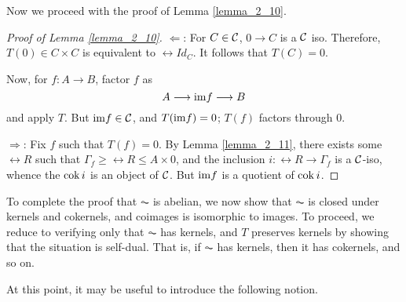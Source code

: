 Now we proceed with the proof of Lemma \ref{lemma_2_10}.

\begin{proof}[Proof of Lemma \ref{lemma_2_10}]
\noindent $\Leftarrow$: For $C \in \mathcal{C}$, $0 \to C$ is
a $\mathcal{C}$ iso. Therefore, $T(0) \in C \times C$ is
equivalent to $\rel{Id}_C$. It follows that $T(C) = 0$.

Now, for $f: A \to B$, factor $f$ as
\[
A \longrightarrow \mathrm{im} f \longrightarrow B
\]
and apply $T$. But $\mathrm{im} f \in \mathcal{C}$, and $T(\mathrm{im} f) = 0$; 
$T(f)$ factors through $0$.

\noindent $\Rightarrow$: Fix $f$ such that $T(f) = 0$. By Lemma 
\ref{lemma_2_11}, there exists some $\rel{R}$ such that 
$\Gamma_f \geq \rel{R} \leq A \times 0$, and the inclusion $i: 
\rel{R} \to \Gamma_f$ is a $\mathcal{C}$-iso, whence the $\mathrm{cok}\, i$ is 
an object of $\mathcal{C}$. But $\mathrm{im} f$ is a quotient of $\mathrm{cok}\, i$.
\end{proof}

To complete the proof that $\AC$ is abelian, we now show that 
$\AC$ is closed under kernels and cokernels, and coimages is 
isomorphic to images. To proceed, we reduce to verifying only 
that $\AC$ has kernels, and $T$ preserves kernels by showing that
the situation is self-dual. That is, if $\AC$ has kernels, then
it has cokernels, and so on.

At this point, it may be useful to introduce the following 
notion.

